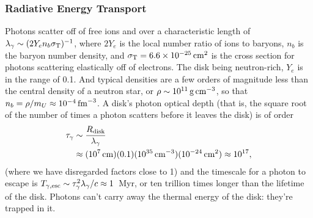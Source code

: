 \subsubsection{Radiative Energy Transport}
\label{sssc:nu_E_transport}
Photons scatter off of free ions and over a characteristic length of
$\lambda_\gamma\sim(2Y_e n_b\sigma_{\rm T})^{-1}$, where $2Y_e$ is the local
number ratio of ions to baryons, $n_b$ is the baryon number density, and
$\sigma_{\rm T}=6.6\times10^{-25}\,{\rm cm}^2$ is the cross section
for photons scattering elastically off of electrons. The disk being
neutron-rich, $Y_e$ is in the range of 0.1. And typical densities are a
few orders of magnitude less than the central density of a neutron star,
or $\rho\sim10^{11}\,{\rm g\,cm}^{-3}$,
so that $n_b=\rho/m_U\approx10^{-4}\,{\rm fm}^{-3}$.
A disk's photon optical depth (that is, the square root of the number of times
a photon scatters before it leaves the disk) is of order
\begin{align}
  \tau_\gamma &\sim \frac{R_{\rm disk}}{\lambda_\gamma} \nonumber \\
  &\approx (10^7\,{\rm cm})(0.1)(10^{35}\,{\rm cm}^{-3})(10^{-24}\,{\rm cm}^2)
  \approx 10^{17}, \nonumber
\end{align}
(where we have disregarded factors close to 1)
and the timescale for a photon to escape is
$T_{\gamma,\rm esc}\sim\tau_\gamma^2\lambda_\gamma/c\approx1$~Myr, or ten
trillion times longer than the lifetime of the disk.
Photons can't carry away the thermal energy of the disk: they're trapped in it.

